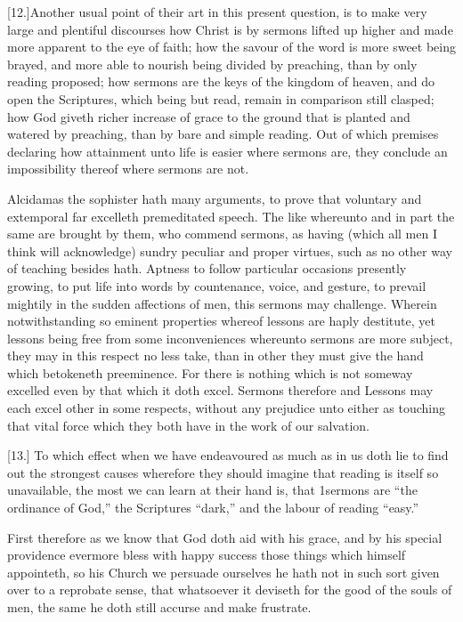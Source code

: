 [12.]Another usual point of their art in this present question, is to make very large and plentiful discourses how Christ is by sermons lifted up higher and made more apparent to the eye of faith; how the savour of the word is more sweet being brayed, and more able to nourish being divided by preaching, than by only reading proposed; how sermons are the keys of the kingdom of heaven, and do open the Scriptures, which being but read, remain in comparison still clasped; how God giveth richer increase of grace  to the ground that is planted and watered by preaching, than by bare and simple reading. Out of which premises declaring how attainment unto life is easier where sermons are, they conclude an impossibility thereof where sermons are not.

Alcidamas the sophister hath many arguments, to prove that voluntary and extemporal far excelleth premeditated speech. The like whereunto and in part the same are brought by them, who commend sermons, as having (which all men I think will acknowledge) sundry peculiar and proper virtues, such as no other way of teaching besides hath. Aptness to follow particular occasions presently growing, to put life into words by countenance, voice, and gesture, to prevail mightily in the sudden affections of men, this sermons may challenge. Wherein notwithstanding so eminent properties whereof lessons are haply destitute, yet lessons being free from some inconveniences whereunto sermons are more subject, they may in this respect no less take, than in other they must give the hand which betokeneth preeminence. For there is nothing which is not someway excelled even by that which it doth excel. Sermons therefore and Lessons may each excel other in some respects, without any prejudice unto either as touching that vital force which they both have in the work of our salvation.




[13.] To which effect when we have endeavoured as much as in us doth lie to find out the strongest causes wherefore they should imagine that reading is itself so unavailable, the most we can learn at their hand is, that 1sermons are “the ordinance of God,” the Scriptures “dark,” and the labour of reading “easy.”

First therefore as we know that God doth aid with his grace, and by his special providence evermore bless with happy success those things which himself appointeth, so his Church we persuade ourselves he hath not in such sort given over to a reprobate sense, that whatsoever it deviseth for the good of the souls of men, the same he doth still accurse and make frustrate.

